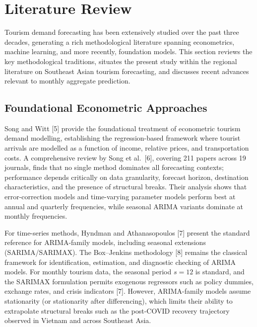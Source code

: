 \documentclass[
]{article}
\begin{document}
\newpage

\section{Literature Review}\label{literature-review}

Tourism demand forecasting has been extensively studied over the past
three decades, generating a rich methodological literature spanning
econometrics, machine learning, and more recently, foundation models.
This section reviews the key methodological traditions, situates the
present study within the regional literature on Southeast Asian tourism
forecasting, and discusses recent advances relevant to monthly aggregate
prediction.

\subsection{Foundational Econometric
Approaches}\label{foundational-econometric-approaches}

Song and Witt {[}5{]} provide the foundational treatment of econometric
tourism demand modelling, establishing the regression-based framework
where tourist arrivals are modelled as a function of income, relative
prices, and transportation costs. A comprehensive review by Song et
al.~{[}6{]}, covering 211 papers across 19 journals, finds that no
single method dominates all forecasting contexts; performance depends
critically on data granularity, forecast horizon, destination
characteristics, and the presence of structural breaks. Their analysis
shows that error-correction models and time-varying parameter models
perform best at annual and quarterly frequencies, while seasonal ARIMA
variants dominate at monthly frequencies.

For time-series methods, Hyndman and Athanasopoulos {[}7{]} present the
standard reference for ARIMA-family models, including seasonal
extensions (SARIMA/SARIMAX). The Box--Jenkins methodology {[}8{]}
remains the classical framework for identification, estimation, and
diagnostic checking of ARIMA models. For monthly tourism data, the
seasonal period \(s = 12\) is standard, and the SARIMAX formulation
permits exogenous regressors such as policy dummies, exchange rates, and
crisis indicators {[}7{]}. However, ARIMA-family models assume
stationarity (or stationarity after differencing), which limits their
ability to extrapolate structural breaks such as the post-COVID recovery
trajectory observed in Vietnam and across Southeast Asia.
\end{document}
